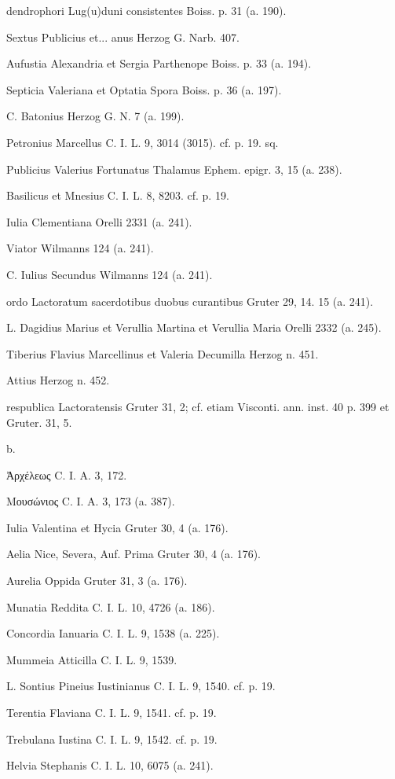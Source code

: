 \documentclass[a4paper, 11pt, oneside, polutonikogreek, german]{article}
\begin{document}
dendrophori Lug(u)duni consistentes Boiss. p. 31 (a. 190).

Sextus Publicius et... anus Herzog G. Narb. 407.

Aufustia Alexandria et Sergia Parthenope Boiss. p. 33 (a. 194).

Septicia Valeriana et Optatia Spora Boiss. p. 36 (a. 197).

C. Batonius Herzog G. N. 7 (a. 199).

Petronius Marcellus C. I. L. 9, 3014 (3015). cf. p. 19. sq.

Publicius Valerius Fortunatus Thalamus Ephem. epigr. 3, 15 (a. 238).

Basilicus et Mnesius C. I. L. 8, 8203. cf. p. 19.

Iulia Clementiana Orelli 2331 (a. 241).

Viator Wilmanns 124 (a. 241).

C. Iulius Secundus Wilmanns 124 (a. 241).

ordo Lactoratum sacerdotibus duobus curantibus Gruter 29, 14. 15 (a. 241).

L. Dagidius Marius et Verullia Martina et Verullia Maria Orelli 2332 (a. 245).

Tiberius Flavius Marcellinus et Valeria Decumilla Herzog n. 451.

Attius Herzog n. 452.

respublica Lactoratensis Gruter 31, 2; cf. etiam Visconti. ann. inst. 40 p. 399 et Gruter. 31, 5.

b.

Ἀρχέλεως C. I. A. 3, 172.

Μουσώνιος C. I. A. 3, 173 (a. 387).

Iulia Valentina et Hycia Gruter 30, 4 (a. 176).

Aelia Nice, Severa, Auf. Prima Gruter 30, 4 (a. 176).

Aurelia Oppida Gruter 31, 3 (a. 176).

Munatia Reddita C. I. L. 10, 4726 (a. 186).

Concordia Ianuaria C. I. L. 9, 1538 (a. 225).

Mummeia Atticilla C. I. L. 9, 1539.

L. Sontius Pineius Iustinianus C. I. L. 9, 1540. cf. p. 19.

Terentia Flaviana C. I. L. 9, 1541. cf. p. 19.

Trebulana Iustina C. I. L. 9, 1542. cf. p. 19.

Helvia Stephanis C. I. L. 10, 6075 (a. 241).
\end{document}
